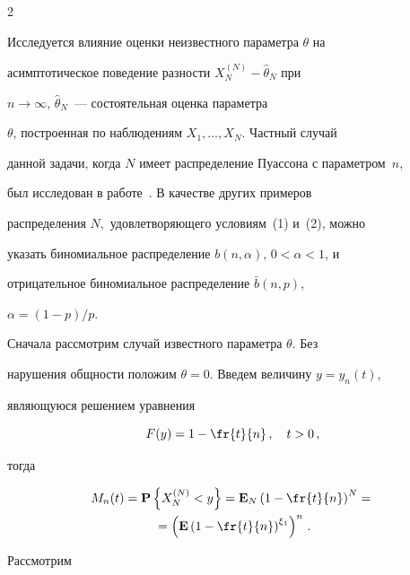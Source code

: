 \begin{multicols}{2}
\begin{equation}
\end{equation}





Исследуется влияние оценки неизвестного параметра $\theta$ на


асимптотическое поведение разности $X_N^{(N)}-\hat \theta_N $ при


$n \to\infty, \, \hat \theta_N$~--- состоятельная оценка параметра


$\theta$, построенная по наблюдениям $X_1,\ldots ,X_N$. Частный случай


данной задачи, когда $N$ имеет распределение Пуассона с параметром~$n$, 


был исследован в работе~\cite{1pag}. В качестве других примеров


распределения $N,$ удовлетворяющего условиям~(1) и~(2), можно


указать биномиальное распределение $b(n,\alpha), \, 0<\alpha<1$, и


отрицательное биномиальное распределение $\bar b(n,p)$,


$\alpha=(1-p)/p$.





Сначала рассмотрим случай известного па\-ра\-мет\-ра $\theta$. Без


нарушения общности положим $\theta=0$. Введем величину $y=y_n(t)$,


являющуюся решением уравнения


\begin{equation}


F(y)=1-\fr{t}{n}\,, \quad t>0\,,


\label{3}


\end{equation}


 тогда


 \begin{multline*}


M_n(t)={\bf P}\left\{X_N^{(N)}<y\right\}={\bf E}_N\left(1-\fr{t}{n}\right)^N={}\\


{}=\left({\bf E}


 \left(1-\fr{t}{n}\right)^{\xi_1}\right)^n\,.


\end{multline*}


Рассмотрим


 \begin{multline*}



\end{multline*}
\end{multicols}
